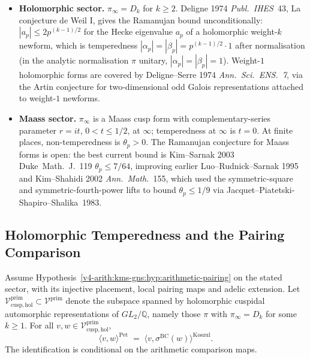 \begin{itemize}
\item \textbf{Holomorphic sector.} \(\pi_{\infty}=D_{k}\) for
\(k\geq 2\). Deligne 1974 \emph{Publ.~IHES}~43, La conjecture de Weil
I, gives the Ramanujan bound unconditionally: \(|a_{p}|\leq 2 p^{(k-1)/2}\)
for the Hecke eigenvalue \(a_{p}\) of a holomorphic weight-\(k\) newform,
which is temperedness
\(|\alpha_{p}|=|\beta_{p}|=p^{(k-1)/2}\cdot 1\) after normalisation
(in the analytic normalisation \(\pi\) unitary,
\(|\alpha_{p}|=|\beta_{p}|=1\)). Weight-\(1\) holomorphic forms are
covered by Deligne--Serre 1974 \emph{Ann.~Sci.~ENS.~7}, via the
Artin conjecture for two-dimensional odd Galois representations
attached to weight-\(1\) newforms.
\item \textbf{Maass sector.} \(\pi_{\infty}\) is a Maass cusp form with
complementary-series parameter \(r=it\), \(0<t\leq 1/2\), at \(\infty\);
temperedness at \(\infty\) is \(t=0\). At finite places, non-temperedness
is \(\theta_{p}>0\). The Ramanujan conjecture for Maass forms is open:
the best current bound is Kim--Sarnak 2003 Duke~Math.~J.~119
\(\theta_{p}\leq 7/64\), improving earlier Luo--Rudnick--Sarnak 1995
and Kim--Shahidi 2002 \emph{Ann.~Math.}~155, which used the
symmetric-square and symmetric-fourth-power lifts to bound
\(\theta_{p}\leq 1/9\) via Jacquet--Piatetski-Shapiro--Shalika~1983.
\end{itemize}

\subsection{Holomorphic Temperedness and the Pairing Comparison}
\label{v4-arith:w5-c:non-tempered:holomorphic}

\begin{theorem}
\label{v4-arith:w5-c:thm:holomorphic-cuspidal}
Assume Hypothesis~\ref{v4-arith:kms-gns:hyp:arithmetic-pairing}
on the stated sector, with its injective placement, local pairing maps
and adelic extension.
Let \(\mathcal{V}^{\mathrm{prim}}_{\mathrm{cusp,hol}}\subset\mathcal{V}^{\mathrm{prim}}\)
denote the subspace spanned by holomorphic cuspidal automorphic
representations of \(GL_{2}/\mathbb{Q}\), namely those \(\pi\) with
\(\pi_{\infty}=D_{k}\) for some \(k\geq 1\). For all
\(v,w\in\mathcal{V}^{\mathrm{prim}}_{\mathrm{cusp,hol}}\),
\begin{equation}
\label{v4-arith:w5-c:eq:holomorphic}
\langle v,w\rangle^{\mathrm{Pet}}
\;=\;\langle v,\sigma^{\mathrm{BC}}(w)\rangle^{\mathrm{Koszul}}.
\end{equation}
The identification is conditional on the arithmetic comparison maps.
\end{theorem}

